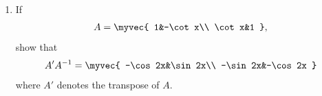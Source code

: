 \begin{enumerate}[label=\thesubsection.\arabic*, ref=\thesubsection.\theenumi]
From the first row,
\begin{align}
    2a+3b+10c&=4\end{align}
    substituting \eqref{eq:EE26BTECH11211_Prob_40.17} and \eqref{eq:EE26BTECH11211_Prob_40.21}
    \begin{align}
    2a+3\brak{\frac{1}{3}}
    +10\brak{\frac{1}{5}}&=4\\
    2a+1+2&=4\\
    a&=\frac{1}{2}
\end{align}

Since
\begin{align}
    a=\frac{1}{x},\qquad
    b=\frac{1}{y},\qquad
    c=\frac{1}{z}
\end{align}

Therefore,
\begin{align}
    x&=2\\
    y&=3\\
    z&=5
\end{align}

\item
If
\begin{align}
A=
\myvec{
1&-\cot x\\
\cot x&1
},
\end{align}
show that
\begin{align}
A'A^{-1}
=
\myvec{
-\cos 2x&\sin 2x\\
-\sin 2x&-\cos 2x
}
\end{align}
where $A'$ denotes the transpose of $A$.


\end{enumerate}
